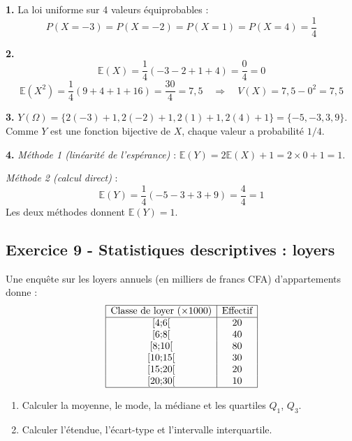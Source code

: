 \documentclass[12pt,a4paper]{article}
\begin{document}
\begin{boitecorrige}
\textbf{1.} La loi uniforme sur 4 valeurs équiprobables :
\[
P(X=-3)=P(X=-2)=P(X=1)=P(X=4)=\frac{1}{4}
\]

\textbf{2.}
\[
\mathbb{E}(X) = \frac{1}{4}(-3-2+1+4) = \frac{0}{4} = 0
\]
\[
\mathbb{E}(X^2) = \frac{1}{4}(9+4+1+16) = \frac{30}{4} = 7{,}5 \quad\Rightarrow\quad V(X) = 7{,}5 - 0^2 = 7{,}5
\]

\textbf{3.} $Y(\Omega) = \{2(-3)+1, 2(-2)+1, 2(1)+1, 2(4)+1\} = \{-5, -3, 3, 9\}$. Comme $Y$ est une fonction bijective de $X$, chaque valeur a probabilité $1/4$.

\textbf{4.} \emph{Méthode 1 (linéarité de l'espérance)} : $\mathbb{E}(Y) = 2\mathbb{E}(X)+1 = 2\times0+1 = 1$.

\emph{Méthode 2 (calcul direct)} :
\[
\mathbb{E}(Y) = \frac{1}{4}(-5-3+3+9) = \frac{4}{4} = 1
\]
Les deux méthodes donnent $\mathbb{E}(Y) = 1$.
\end{boitecorrige}

\subsection*{Exercice 9 - Statistiques descriptives : loyers \niveau{\moyen}}

\begin{boiteexercice}
Une enquête sur les loyers annuels (en milliers de francs CFA) d'appartements donne :
\[
\begin{array}{|c|c|}
\hline
\text{Classe de loyer (×1000)} & \text{Effectif} \\
\hline
${[}4;6{[}$ & 20 \\
${[}6;8{[}$ & 40 \\
${[}8;10{[}$ & 80 \\
${[}10;15{[}$ & 30 \\
${[}15;20{[}$ & 20 \\
${[}20;30{[}$ & 10 \\
\hline
\end{array}
\]
\begin{enumerate}
  \item Calculer la moyenne, le mode, la médiane et les quartiles $Q_1$, $Q_3$.
  \item Calculer l'étendue, l'écart-type et l'intervalle interquartile.
\end{enumerate}
\end{boiteexercice}
\end{document}
